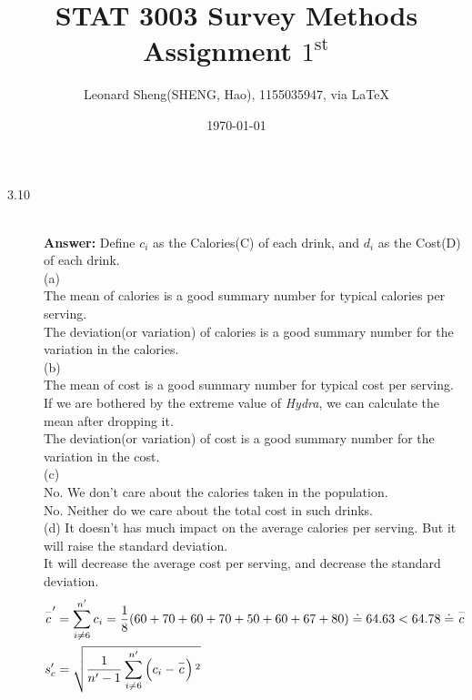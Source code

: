 \documentclass{article}
\begin{document}
\title{STAT 3003 Survey Methods \\Assignment $1^{\text{st}}$}
\author{{\normalsize Leonard Sheng(SHENG, Hao), 1155035947, via \LaTeX}}
\date{\today}

\maketitle

\def \Pr{{\rm Pr}}


\baselineskip 0.6cm

\begin{description}


    \item[3.10 ]\hfill\\
        {\bf Answer:} Define $c_i$ as the Calories(C) of each drink, and $d_i$ as the Cost(D) of each drink. \\
        (a)\\
        The  mean of calories is a good summary number for typical calories per serving.\\
        The deviation(or variation) of calories is a good summary number for the variation in the calories.\\
        (b)\\
        The  mean of cost is a good summary number for typical cost per serving. If we are bothered by the extreme value of {\it Hydra}, we can calculate the mean after dropping it.\\
        The deviation(or variation) of cost is a good summary number for the variation in the cost.\\
        (c) \\
            No. We don't care about the calories taken in the population.\\
            No. Neither do we care about the total cost in such drinks.\\
        (d)
        It doesn't has much impact on the average calories per serving. But it will raise the standard deviation.\\
        It will decrease the average cost per serving, and decrease the standard deviation.
        \begin{align}
            \overset{-}{c}'&=\sum _{i\neq 6}^{n'} c_i=\frac{1}{8}(60+70+60+70+50+60+67+80)\doteq 64.63<64.78\doteq \overset{-}{c}\\
            s_c'&=\sqrt{\frac{1}{n'-1}\sum _{i\neq 6}^{n'} \left(c_i-\overset{-}{c}\right){}^2} \notag \\

\end{align}
\end{description}
\end{document}
